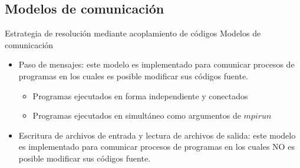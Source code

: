 \begin{frame}
\begin{tikzpicture}
\end{tikzpicture}

\end{frame}


\subsection{Modelos de comunicación}

\begin{frame}
{Estrategia de resolución mediante acoplamiento de códigos}
{Modelos de comunicación}

\begin{itemize}
\item <1-> Paso de mensajes: este modelo es implementado para comunicar procesos de programas en los cuales es posible modificar sus códigos fuente.
  \begin{itemize}
  \item Programas ejecutados en forma independiente y conectados
  \item Programas ejecutados en simultáneo como argumentos de $mpirun$
  \end{itemize}
\item <2-> Escritura de archivos de entrada y lectura de archivos de salida: este modelo es implementado para comunicar procesos de programas en los cuales NO es posible modificar sus códigos fuente.
\end{itemize}

\end{frame}


